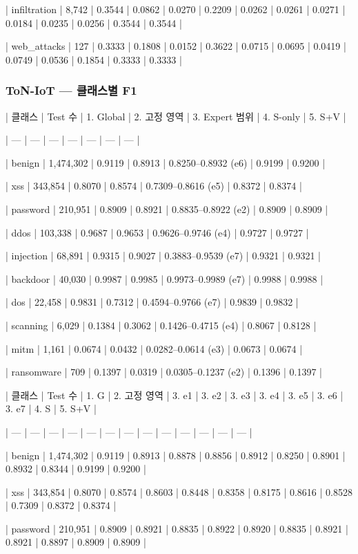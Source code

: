 | infiltration | 8,742 | 0.3544 | 0.0862 | 0.0270 | 0.2209 | 0.0262 | 0.0261 | 0.0271 | 0.0184 | 0.0235 | 0.0256 | 0.3544 | 0.3544 |

| web\_\allowbreak{}attacks | 127 | 0.3333 | 0.1808 | 0.0152 | 0.3622 | 0.0715 | 0.0695 | 0.0419 | 0.0749 | 0.0536 | 0.1854 | 0.3333 | 0.3333 |

\subsubsection{ToN-IoT — 클래스별 F1}
| 클래스 | Test 수 | 1. Global | 2. 고정 영역 | 3. Expert 범위 | 4. S-only | 5. S+\allowbreak{}V |

| --- | --- | --- | --- | --- | --- | --- |

| benign | 1,474,302 | 0.9119 | 0.8913 | 0.8250–0.8932 (e6) | 0.9199 | 0.9200 |

| xss | 343,854 | 0.8070 | 0.8574 | 0.7309–0.8616 (e5) | 0.8372 | 0.8374 |

| password | 210,951 | 0.8909 | 0.8921 | 0.8835–0.8922 (e2) | 0.8909 | 0.8909 |

| ddos | 103,338 | 0.9687 | 0.9653 | 0.9626–0.9746 (e4) | 0.9727 | 0.9727 |

| injection | 68,891 | 0.9315 | 0.9027 | 0.3883–0.9539 (e7) | 0.9321 | 0.9321 |

| backdoor | 40,030 | 0.9987 | 0.9985 | 0.9973–0.9989 (e7) | 0.9988 | 0.9988 |

| dos | 22,458 | 0.9831 | 0.7312 | 0.4594–0.9766 (e7) | 0.9839 | 0.9832 |

| scanning | 6,029 | 0.1384 | 0.3062 | 0.1426–0.4715 (e4) | 0.8067 | 0.8128 |

| mitm | 1,161 | 0.0674 | 0.0432 | 0.0282–0.0614 (e3) | 0.0673 | 0.0674 |

| ransomware | 709 | 0.1397 | 0.0319 | 0.0305–0.1237 (e2) | 0.1396 | 0.1397 |

| 클래스 | Test 수 | 1. G | 2. 고정 영역 | 3. e1 | 3. e2 | 3. e3 | 3. e4 | 3. e5 | 3. e6 | 3. e7 | 4. S | 5. S+\allowbreak{}V |

| --- | --- | --- | --- | --- | --- | --- | --- | --- | --- | --- | --- | --- |

| benign | 1,474,302 | 0.9119 | 0.8913 | 0.8878 | 0.8856 | 0.8912 | 0.8250 | 0.8901 | 0.8932 | 0.8344 | 0.9199 | 0.9200 |

| xss | 343,854 | 0.8070 | 0.8574 | 0.8603 | 0.8448 | 0.8358 | 0.8175 | 0.8616 | 0.8528 | 0.7309 | 0.8372 | 0.8374 |

| password | 210,951 | 0.8909 | 0.8921 | 0.8835 | 0.8922 | 0.8920 | 0.8835 | 0.8921 | 0.8921 | 0.8897 | 0.8909 | 0.8909 |

